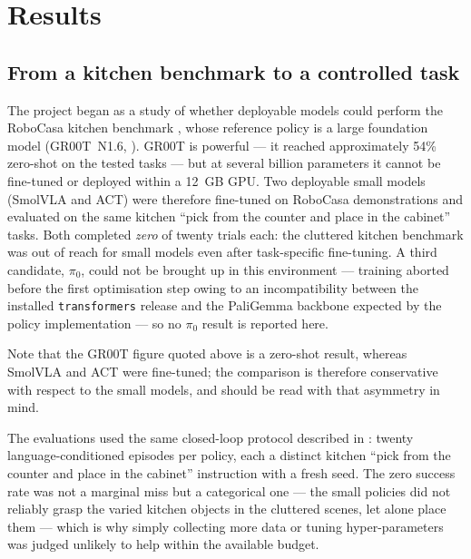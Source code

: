 \chapter{Results}
\label{chap:results}

\section{From a kitchen benchmark to a controlled task}
\label{sec:results-journey}
The project began as a study of whether deployable models could perform the
RoboCasa kitchen benchmark \parencite{nasiriany2024robocasa}, whose reference
policy is a large foundation model (GR00T~N1.6, \parencite{nvidia2025gr00t}). GR00T is
powerful --- it reached approximately 54\% zero-shot on the tested tasks --- but at
several billion parameters it cannot be fine-tuned or deployed within a 12~GB GPU.
Two deployable small models (SmolVLA and ACT) were therefore fine-tuned on RoboCasa
demonstrations and evaluated on the same kitchen ``pick from the counter and place in
the cabinet'' tasks. Both completed \emph{zero} of twenty trials each: the cluttered
kitchen benchmark was out of reach for small models even after task-specific
fine-tuning. A third candidate, $\pi_0$, could not be brought up in this environment
--- training aborted before the first optimisation step owing to an incompatibility
between the installed \texttt{transformers} release and the PaliGemma backbone
expected by the policy implementation --- so no $\pi_0$ result is reported here.

Note that the GR00T figure quoted above is a zero-shot result, whereas SmolVLA and ACT
were fine-tuned; the comparison is therefore conservative with respect to the small
models, and  should be read with that asymmetry in mind.

The evaluations used the same closed-loop protocol described in
: twenty language-conditioned episodes per policy, each a distinct
kitchen ``pick from the counter and place in the cabinet'' instruction with a fresh
seed. The zero success rate was not a marginal miss but a categorical one --- the
small policies did not reliably grasp the varied kitchen objects in the cluttered
scenes, let alone place them --- which is why simply collecting more data or tuning
hyper-parameters was judged unlikely to help within the available budget.

